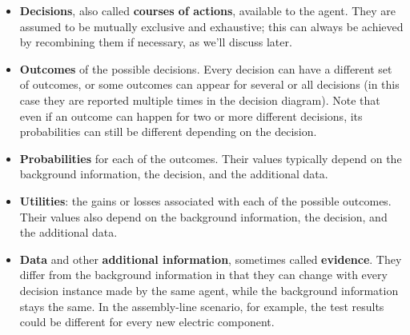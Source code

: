 \documentclass[
  a4paper,
  DIV=11,
  numbers=noendperiod,
  oneside]{scrreprt}
\begin{document}
\begin{itemize}
\item
  { \textbf{Decisions}}, also called \textbf{courses of
  actions}, available to the agent. They are assumed to be mutually
  exclusive and exhaustive; this can always be achieved by recombining
  them if necessary, as we'll discuss later.
\item
  { \textbf{Outcomes}} of the possible decisions. Every
  decision can have a different set of outcomes, or some outcomes can
  appear for several or all decisions (in this case they are reported
  multiple times in the decision diagram). Note that even if an outcome
  can happen for two or more different decisions, its probabilities can
  still be different depending on the decision.
\item
  { \textbf{Probabilities}} for each of the outcomes. Their
  values typically depend on the background information, the decision,
  and the additional data.
\item
  { \textbf{Utilities}}: the gains or losses associated
  with each of the possible outcomes. Their values also depend on the
  background information, the decision, and the additional data.
\item
  { \textbf{Data}} and other {\textbf{additional
  information}}, sometimes called {\textbf{evidence}}. They differ from
  the background information in that they can change with every decision
  instance made by the same agent, while the background information
  stays the same. In the assembly-line scenario, for example, the test
  results could be different for every new electric component.
\end{itemize}

\end{document}
